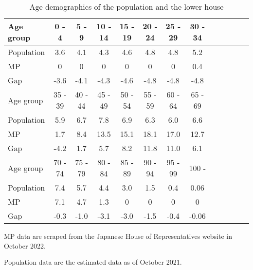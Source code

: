 \begin{table}[H]
  \begin{threeparttable}
    \begin{tabular}{l|cccccccccccc}
    \toprule
    Age group & 0 - 4 & 5 - 9 & 10 - 14 & 15 - 19 & 20 - 24 & 25 - 29 & 30 - 34 \\
    \midrule
    Population & 3.6 & 4.1 & 4.3 & 4.6 & 4.8 & 4.8 & 5.2 \\
    MP & 0 & 0 & 0 & 0 & 0 & 0 & 0.4 \\
    Gap & -3.6 & -4.1 & -4.3 & -4.6 & -4.8 & -4.8 & -4.8 \\
    \midrule
    Age group & 35 - 39 & 40 - 44 & 45 - 49 & 50 - 54 & 55 - 59 & 60 - 64 & 65 - 69 \\
    \midrule
    Population & 5.9 & 6.7 & 7.8 & 6.9 & 6.3 & 6.0 & 6.6 \\
    MP & 1.7 & 8.4 & 13.5 & 15.1 & 18.1 & 17.0 & 12.7 \\
    Gap & -4.2 & 1.7 & 5.7 & 8.2 & 11.8 & 11.0 & 6.1 \\
    \midrule 
    Age group & 70 - 74 & 75 - 79 & 80 - 84 & 85 - 89 & 90 - 94 & 95 - 99 & 100 - \\
    \midrule
    Population & 7.4 & 5.7 & 4.4 & 3.0 & 1.5 & 0.4 & 0.06 \\
    MP & 7.1 & 4.7 & 1.3 & 0 & 0 & 0 & 0 \\
    Gap & -0.3 & -1.0 & -3.1 & -3.0 & -1.5 & -0.4 & -0.06 \\
    \bottomrule
    \end{tabular}
    \begin{tablenotes}[flushleft]
      \scriptsize{
        \item MP data are scraped from the Japanese House of Representatives website in October 2022. 
        \item Population data are the estimated data as of October 2021.
      }
    \end{tablenotes}
  \end{threeparttable}
  \caption{Age demographics of the population and the lower house}
  \label{table:compareAgeComp}
\end{table}